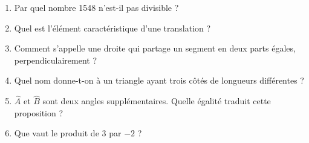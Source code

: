 \begin{enumerate}
        \item Par quel nombre \num{1548} n'est-il pas divisible ?
        \item Quel est l'élément caractéristique d'une translation ?
        \item Comment s'appelle une droite qui partage un segment en deux parts égales, perpendiculairement ?
        \item Quel nom donne-t-on à un triangle ayant trois côtés de longueurs différentes ?
        \item \(\widehat{A}\) et \(\widehat{B}\) sont deux angles supplémentaires. Quelle égalité traduit cette proposition ?
        \item Que vaut le produit de 3 par \(-2\) ?
    \end{enumerate}
